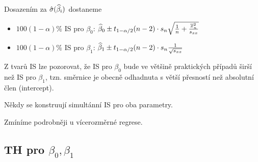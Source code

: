 Dosazením za $\hat{\sigma}(\widehat{\beta}_i)$ dostaneme

\begin{itemize}
	\item $100(1-\alpha)\%$ IS pro $\beta_0$: $\widehat{\beta}_0 \pm t_{1-\alpha/2}(n-2) \cdot s_n \sqrt{\frac{1}{n} + \frac{\overline{x}_n^2}{s_{xx}}}$
	\item $100(1-\alpha)\%$ IS pro $\beta_1$: $\widehat{\beta}_1 \pm t_{1-\alpha/2}(n-2) \cdot s_n \frac{1}{\sqrt{s_{xx}}}$
\end{itemize}

\begin{remark}
	Z tvarů IS lze pozorovat, že IS pro $\beta_0$ bude ve většině praktických případů širší než IS pro $\beta_1$, tzn. směrnice je obecně odhadnuta s větší přesností než absolutní člen (intercept).
\end{remark}


\begin{remark}
	Někdy se konstruují simultánní IS pro oba parametry. 

\begin{center}
    
\end{center}	
	
	 Zmíníme podrobněji u vícerozměrné regrese.
\end{remark}


\subsection{TH pro $\beta_0, \beta_1$}


